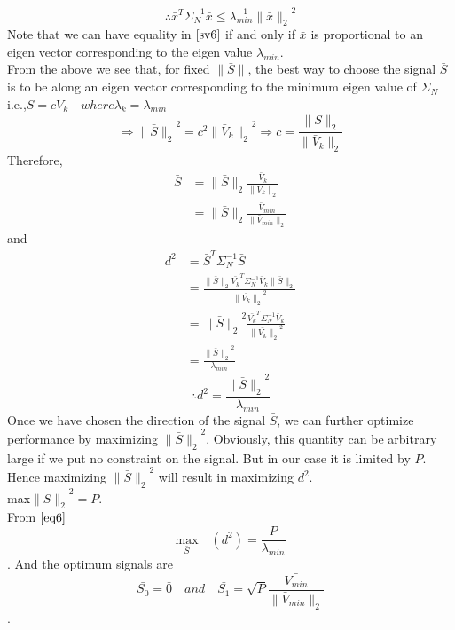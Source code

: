 \documentclass[12pt]{report}
\begin{document}
\begin{equation}
\label{sv6} \therefore\bar{x}^T\varSigma_{N}^{-1}\bar{x}\leq\lambda_{min}^{-1}{\parallel\bar{x}\parallel_2}^2
\end{equation}
Note that we can have equality in $\eqref{sv6}$ if and only if $\bar{x}$ is proportional to an eigen vector corresponding to the eigen value $\lambda_{min}$.\\ \indent From the above we see that, for fixed $\parallel\bar{S}\parallel$, the best way to choose the signal $\bar{S}$ is to be along an eigen vector corresponding to the minimum eigen value of $\varSigma_{N}$ i.e.,$\bar{S}=c\bar{V}_k\quad where \lambda_k=\lambda_{min}$
\[\Rightarrow{\parallel\bar{S}\parallel_2}^2=c^2{\parallel\bar{V}_k\parallel_2}^2 \Rightarrow c=\frac{\parallel\bar{S}\parallel_2}{\parallel\bar{V}_k\parallel_2}\]Therefore,
\begin{align*}
\bar{S}&=\parallel\bar{S}\parallel_2\frac{\bar{V}_k}{\parallel\bar{V}_k\parallel_2}\\&= \parallel\bar{S}\parallel_2\frac{\bar{V}_{min}}{\parallel\bar{V}_{min}\parallel_2}
\end{align*} and
\begin{align*}
d^2&=\bar{S}^T\varSigma_{N}^{-1}\bar{S}\\&= \frac{\parallel\bar{S}\parallel_2\bar{V_k}^T\varSigma_{N}^{-1}\bar{V}_k\parallel\bar{S}\parallel_2}{{\parallel\bar{V_k}\parallel_2}^2}\\&= {\parallel\bar{S}\parallel_2}^2\frac{\bar{V_k}^T\varSigma_{N}^{-1}\bar{V}_k}{{\parallel\bar{V_k}\parallel_2}^2}\\&= \frac{{\parallel\bar{S}\parallel_2}^2}{\lambda_{min}}   \end{align*}
\begin{equation}
\label{eq6}
\therefore d^2=\frac{{\parallel\bar{S}\parallel_2}^2}{\lambda_{min}}
\end{equation}
Once we have chosen the direction of the signal $\bar{S}$, we can further optimize performance by maximizing ${\parallel\bar{S}\parallel_2}^2$. Obviously, this quantity can be arbitrary large if we put no constraint  on the signal. But in our case it is limited by $P$. Hence maximizing  ${\parallel\bar{S}\parallel_2}^2$ will result in maximizing $d^2$.\\
 max${\parallel\bar{S}\parallel_2}^2=P$.\\
  From $\eqref{eq6}$\[\underset{\bar{S}}{\mathrm{max}}\quad (d^2)=\frac{P}{\lambda_{min}}\]. And the optimum signals are\[\bar{S_0}=\bar{0}\quad and\quad \bar{S_1}={\sqrt{P}}\frac{\bar{V_{min}}}{\parallel\bar{V}_{min}\parallel_2}\].
\end{document}
